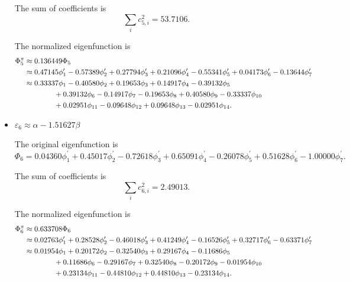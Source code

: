 \begin{itemize}
		The sum of coefficients is
		\begin{equation*}
			\sum_{i} c^2_{5,i} = 53.7106.
		\end{equation*}
		
		The normalized eigenfunction is
		\begin{align}
			\Phi^\pi_5 &\approx 0.136449 \Phi_5 \notag \\
			&\approx 0.47145 \phi^\prime_1 -0.57389 \phi^\prime_2 +0.27794 \phi^\prime_3 + 0.21096 \phi^\prime_4 - 0.55341 \phi^\prime_5 + 0.04173 \phi^\prime_6 - 0.13644 \phi^\prime_7 \notag \\
			&\approx 0.33337 \phi_1 -0.40580 \phi_2 +0.19653 \phi_3 + 0.14917 \phi_4 - 0.39132 \phi_5  \notag \\
			&\hspace*{4em} +0.39132 \phi_6 -0.14917 \phi_7 -0.19653 \phi_8 +0.40580 \phi_9 -0.33337 \phi_{10} \notag \\
			&\hspace*{4em} + 0.02951 \phi_{11} - 0.09648 \phi_{12} + 0.09648 \phi_{13} - 0.02951 \phi_{14} .
		\end{align}
		
		
		\item $\varepsilon_6 \approx \alpha -1.51627 \beta$
		
		The original eigenfunction is
		\begin{equation*}
			\Phi_6 = 0.04360 \phi^\prime_1 + 0.45017 \phi^\prime_2 -0.72618 \phi^\prime_3 +0.65091 \phi^\prime_4 -0.26078 \phi^\prime_5 + 0.51628 \phi^\prime_6 - 1.00000 \phi^\prime_7.
		\end{equation*}
		
		The sum of coefficients is
		\begin{equation*}
			\sum_{i} c^2_{6,i} = 2.49013.
		\end{equation*}
		
		The normalized eigenfunction is
		\begin{align}
			\Phi^\pi_6 &\approx 0.633708 \Phi_6 \notag \\
			&\approx 0.02763 \phi^\prime_1 + 0.28528 \phi^\prime_2 -0.46018 \phi^\prime_3 + 0.41249 \phi^\prime_4 - 0.16526 \phi^\prime_5 + 0.32717 \phi^\prime_6 - 0.63371 \phi^\prime_7 \notag \\
			&\approx 0.01954 \phi_1 +0.20172 \phi_2 - 0.32540 \phi_3 +0.29167 \phi_4 -0.11686 \phi_5  \notag \\
			&\hspace*{4em} +0.11686 \phi_6 -0.29167 \phi_7 + 0.32540\phi_8 -0.20172 \phi_9 - 0.01954 \phi_{10} \notag \\
			&\hspace*{4em} + 0.23134 \phi_{11} -0.44810 \phi_{12} +0.44810 \phi_{13} - 0.23134  \phi_{14} .
		\end{align}
		

\end{itemize}
